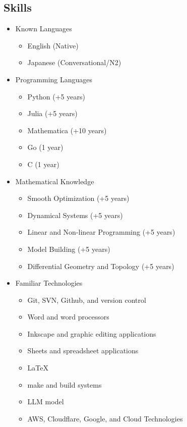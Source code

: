 \subsection{Skills}

\begin{itemize}
  \item Known Languages
    \begin{itemize}
      \item English (Native)
      \item Japanese (Conversational/N2)
    \end{itemize}
  \item Programming Languages
    \begin{itemize}
      \item Python (+5 years)
      \item Julia (+5 years)
      \item Mathematica (+10 years)
      \item Go (1 year)
      \item C (1 year)
    \end{itemize}
  \item Mathematical Knowledge
    \begin{itemize}
      \item Smooth Optimization (+5 years)
      \item Dynamical Systems (+5 years)
      \item Linear and Non-linear Programming (+5 years)
      \item Model Building (+5 years)
      \item Differential Geometry and Topology (+5 years)
    \end{itemize}
  \item Familiar Technologies
    \begin{itemize}
      \item Git, SVN, Github, and version control
      \item Word and word processors
      \item Inkscape and graphic editing applications
      \item Sheets and spreadsheet applications
      \item LaTeX
      \item make and build systems
      \item LLM model
      \item AWS, Cloudflare, Google, and Cloud Technologies
    \end{itemize}
\end{itemize}


